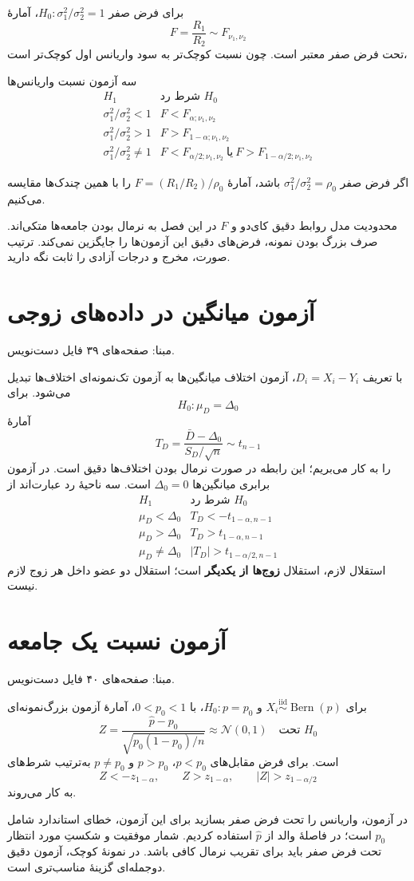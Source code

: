 \documentclass[12pt,a4paper,oneside]{report}
\newcounter{ex}[chapter]
\newcommand{\source}[1]{\par{\small\color{muted} مبنا: صفحه‌های #1 فایل دست‌نویس.}\par}
\newcommand{\iid}{\overset{\mathrm{iid}}{\sim}}
\newcommand{\N}{\mathcal N}
\begin{document}
برای فرض صفر $H_0:\sigma_1^2/\sigma_2^2=1$، آمارهٔ
\[F=\frac{R_1}{R_2}\sim F_{\nu_1,\nu_2}\]
تحت فرض صفر معتبر است. چون نسبت کوچک‌تر به سود واریانس اول کوچک‌تر است،
\begin{result}{سه آزمون نسبت واریانس‌ها}
\[
\begin{array}{c|c}
H_1&\text{شرط رد }H_0\\\hline
\sigma_1^2/\sigma_2^2<1&F<F_{\alpha;\nu_1,\nu_2}\\[2pt]
\sigma_1^2/\sigma_2^2>1&F>F_{1-\alpha;\nu_1,\nu_2}\\[2pt]
\sigma_1^2/\sigma_2^2\ne1&F<F_{\alpha/2;\nu_1,\nu_2}\ \text{یا}\ F>F_{1-\alpha/2;\nu_1,\nu_2}
\end{array}
\]
\end{result}
اگر فرض صفر $\sigma_1^2/\sigma_2^2=\rho_0$ باشد، آمارهٔ $F=(R_1/R_2)/\rho_0$ را با همین چندک‌ها مقایسه می‌کنیم.
\begin{important}{محدودیت مدل}
روابط دقیق کای‌دو و $F$ در این فصل به نرمال بودن جامعه‌ها متکی‌اند. صرف بزرگ بودن نمونه، فرض‌های دقیق این آزمون‌ها را جایگزین نمی‌کند. ترتیب صورت، مخرج و درجات آزادی را ثابت نگه دارید.
\end{important}
\section{آزمون میانگین در داده‌های زوجی}
\source{۳۹}
با تعریف $D_i=X_i-Y_i$، آزمون اختلاف میانگین‌ها به آزمون تک‌نمونه‌ای اختلاف‌ها تبدیل می‌شود. برای
\[H_0:\mu_D=\Delta_0\]
آمارهٔ
\[T_D=\frac{\bar D-\Delta_0}{S_D/\sqrt n}\sim t_{n-1}\]
را به کار می‌بریم؛ این رابطه در صورت نرمال بودن اختلاف‌ها دقیق است. در آزمون برابری میانگین‌ها $\Delta_0=0$ است. سه ناحیهٔ رد عبارت‌اند از
\[
\begin{array}{c|c}
H_1&\text{شرط رد }H_0\\\hline
\mu_D<\Delta_0&T_D<-t_{1-\alpha,n-1}\\[2pt]
\mu_D>\Delta_0&T_D>t_{1-\alpha,n-1}\\[2pt]
\mu_D\ne\Delta_0&|T_D|>t_{1-\alpha/2,n-1}
\end{array}
\]
استقلال لازم، استقلال \textbf{زوج‌ها از یکدیگر} است؛ استقلال دو عضو داخل هر زوج لازم نیست.
\section{آزمون نسبت یک جامعه}
\source{۴۰}
برای $X_i\iid\operatorname{Bern}(p)$ و $H_0:p=p_0$، با $0<p_0<1$، آمارهٔ آزمون بزرگ‌نمونه‌ای
\[Z=\frac{\widehat p-p_0}{\sqrt{p_0(1-p_0)/n}}\approx\N(0,1)\quad\text{تحت }H_0\]
است. برای فرض مقابل‌های $p<p_0$، $p>p_0$ و $p\ne p_0$ به‌ترتیب شرط‌های
\[
Z<-z_{1-\alpha},\qquad Z>z_{1-\alpha},\qquad |Z|>z_{1-\alpha/2}
\]
به کار می‌روند.
\begin{important}{در آزمون، واریانس را تحت فرض صفر بسازید}
برای این آزمون، خطای استاندارد شامل $p_0$ است؛ در فاصلهٔ والد از $\widehat p$ استفاده کردیم. شمار موفقیت و شکستِ مورد انتظار تحت فرض صفر باید برای تقریب نرمال کافی باشد. در نمونهٔ کوچک، آزمون دقیق دوجمله‌ای گزینهٔ مناسب‌تری است.
\end{important}
\end{document}
